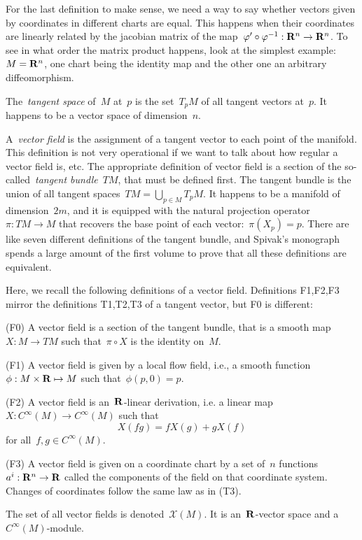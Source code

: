 For the last definition to make sense, we need a way to say whether vectors
given by coordinates in different charts are equal.  This happens when their
coordinates are linearly related by the jacobian matrix of the
map~$\varphi'\circ\varphi^{-1}:\mathbf{R}^n\to\mathbf{R}^n$.  To see in what order the matrix
product happens, look at the simplest example:~$M=\mathbf{R}^n$, one chart being the
identity map and the other one an arbitrary diffeomorphism.

The~\emph{tangent space} of~$M$ at~$p$ is the set~$T_pM$ of all tangent
vectors at~$p$.  It happens to be a vector space of dimension~$n$.

A~\emph{vector field} is the assignment of a tangent vector to each point of
the manifold.  This definition is not very operational if we want to talk
about how regular a vector field is, etc.  The appropriate definition of
vector field is a section of the so-called~\emph{tangent bundle}~$TM$, that
must be defined first.  The tangent bundle is the union of all tangent
spaces~$TM=\bigcup_{p\in M}T_pM$.  It happens to be a manifold of
dimension~$2m$, and it is equipped with the natural projection
operator~$\pi:TM\to M$ that recovers the base point of each
vector:~$\pi\left(X_p\right)=p$.  There are like seven different definitions
of the tangent bundle, and Spivak's monograph spends a large amount of the
first volume to prove that all these definitions are equivalent.

Here, we recall the following definitions of a vector field.  Definitions
F1,F2,F3 mirror the definitions T1,T2,T3 of a tangent vector, but F0 is
different:

(F0) A vector field is a section of the tangent bundle, that is a
smooth map~$X:M\to TM$ such that~$\pi\circ X$ is the identity on~$M$.

(F1) A vector field is given by a local flow field, i.e., a smooth
function~$\phi:M\times\mathbf{R}\mapsto M$ such that~$\phi(p,0)=p$.

(F2) A vector field is an~$\mathbf{R}$-linear derivation, i.e. a linear
map~$X:C^\infty(M)\to C^\infty(M)$ such that
\[
	X(fg)=fX(g)+gX(f)
\]
for all~$f,g\in C^\infty(M)$.

(F3) A vector field is given on a coordinate chart by a set of~$n$
functions~$a^i:\mathbf{R}^n\to\mathbf{R}$ called the components of the field on that
coordinate system.  Changes of coordinates follow the same law as in (T3).

The set of all vector fields is denoted~$\mathcal{X}(M)$.
It is an~$\mathbf{R}$-vector space and a~$C^\infty(M)$-module.

